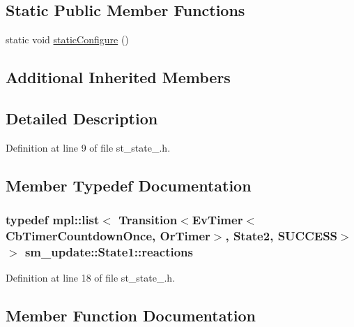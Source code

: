 \subsection*{Static Public Member Functions}
\begin{DoxyCompactItemize}
\item 
static void \hyperlink{structsm__update_1_1State1_a00f0da78710050b3a722dda91bc807cb}{static\+Configure} ()
\end{DoxyCompactItemize}
\subsection*{Additional Inherited Members}


\subsection{Detailed Description}


Definition at line 9 of file st\+\_\+state\+\_.\+h.



\subsection{Member Typedef Documentation}
\subsubsection[{\texorpdfstring{reactions}{reactions}}]{\setlength{\rightskip}{0pt plus 5cm}typedef mpl\+::list$<$ Transition$<${\bf Ev\+Timer}$<${\bf Cb\+Timer\+Countdown\+Once}, {\bf Or\+Timer}$>$, {\bf State2}, {\bf S\+U\+C\+C\+E\+SS}$>$ $>$ {\bf sm\+\_\+update\+::\+State1\+::reactions}}\hypertarget{structsm__update_1_1State1_afecf0d56718ca6d3f567b2abf23641d8}{}\label{structsm__update_1_1State1_afecf0d56718ca6d3f567b2abf23641d8}


Definition at line 18 of file st\+\_\+state\+\_.\+h.



\subsection{Member Function Documentation}
